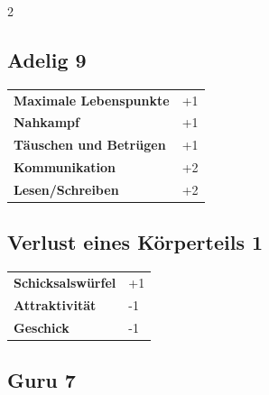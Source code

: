 \begin{multicols}{2}
\begin{tcolorbox}
    \subsection*{Adelig \hfill \small{9 }}
    \tcblower




\begin{tabular}{@{}ll@{}}
    \textbf{Maximale Lebenspunkte} & +1\\
    \textbf{Nahkampf} & +1\\
    \textbf{Täuschen und Betrügen} & +1\\
    \textbf{Kommunikation} & +2\\
    \textbf{Lesen/Schreiben} & +2\\
\end{tabular}


\end{tcolorbox}

\begin{tcolorbox}
    \subsection*{Verlust eines Körperteils \hfill \small{1 }}
    \tcblower




\begin{tabular}{@{}ll@{}}
    \textbf{Schicksalswürfel} & +1\\
    \textbf{Attraktivität} & -1\\
    \textbf{Geschick} & -1\\
\end{tabular}


\end{tcolorbox}

\begin{tcolorbox}
    \subsection*{Guru \hfill \small{7 }}
    \tcblower





\end{tcolorbox}
\end{multicols}

